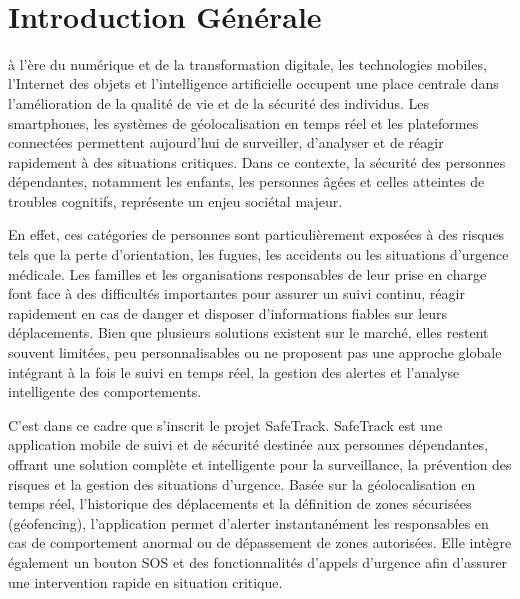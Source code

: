 ﻿﻿\chapter*{Introduction Générale }
\label{Intro}
{}

\minitoc


à l'ère du numérique et de la transformation digitale, les technologies mobiles, l'Internet des objets et l'intelligence artificielle occupent une place centrale dans l'amélioration de la qualité de vie et de la sécurité des individus. Les smartphones, les systèmes de géolocalisation en temps réel et les plateformes connectées permettent aujourd'hui de surveiller, d'analyser et de réagir rapidement à des situations critiques. Dans ce contexte, la sécurité des personnes dépendantes, notamment les enfants, les personnes âgées et celles atteintes de troubles cognitifs, représente un enjeu sociétal majeur.

En effet, ces catégories de personnes sont particulièrement exposées à des risques tels que la perte d'orientation, les fugues, les accidents ou les situations d'urgence médicale. Les familles et les organisations responsables de leur prise en charge font face à des difficultés importantes pour assurer un suivi continu, réagir rapidement en cas de danger et disposer d'informations fiables sur leurs déplacements. Bien que plusieurs solutions existent sur le marché, elles restent souvent limitées, peu personnalisables ou ne proposent pas une approche globale intégrant à la fois le suivi en temps réel, la gestion des alertes et l'analyse intelligente des comportements.

C'est dans ce cadre que s'inscrit le projet SafeTrack. SafeTrack est une application mobile de suivi et de sécurité destinée aux personnes dépendantes, offrant une solution complète et intelligente pour la surveillance, la prévention des risques et la gestion des situations d'urgence. Basée sur la géolocalisation en temps réel, l'historique des déplacements et la définition de zones sécurisées (géofencing), l'application permet d'alerter instantanément les responsables en cas de comportement anormal ou de dépassement de zones autorisées. Elle intègre également un bouton SOS et des fonctionnalités d'appels d'urgence afin d'assurer une intervention rapide en situation critique.

